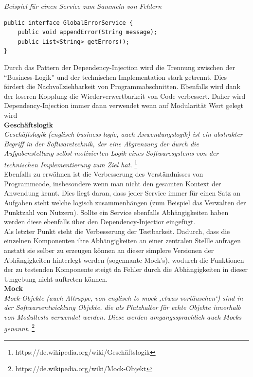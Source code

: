 \begin{minipage}{\textwidth}
\emph{Beispiel für einen Service zum Sammeln von Fehlern}
\begin{lstlisting}
public interface GlobalErrorService {
	public void appendError(String message);
	public List<String> getErrors();
}
\end{lstlisting}
\end{minipage}

Durch das Pattern der Dependency-Injection wird die Trennung zwischen der ``Business-Logik'' und der technischen Implementation stark getrennt. Dies fördert die Nachvollziehbarkeit von Programmabschnitten. Ebenfalls wird dank der loseren Kopplung die Wiederverwertbarkeit von Code verbessert. Daher wird Dependency-Injection immer dann verwendet wenn auf Modularität Wert gelegt wird \\


\textbf{Geschäftslogik} \\
\emph{\glqq   
Geschäftslogik (englisch business logic, auch Anwendungslogik) ist ein abstrakter Begriff in der Softwaretechnik, der eine Abgrenzung der durch die Aufgabenstellung selbst motivierten Logik eines Softwaresystems von der technischen Implementierung zum Ziel hat.
\grqq} \footnote{https://de.wikipedia.org/wiki/Geschäftslogik} \\

Ebenfalls zu erwähnen ist die Verbesserung des Verständnisses von Programmcode, insbesondere wenn man nicht den gesamten Kontext der Anwendung kennt. Dies liegt daran, dass jeder Service immer für einen Satz an Aufgaben steht welche logisch zusammenhängen (zum Beispiel das Verwalten der Punktzahl von Nutzern). Sollte ein Service ebenfalls Abhängigkeiten haben werden diese ebenfalls über den Dependency-Injectior eingefügt. \\

Als letzter Punkt steht die Verbesserung der Testbarkeit. Dadurch, dass die einzelnen Komponenten ihre Abhängigkeiten an einer zentralen Stellle anfragen anstatt sie selber zu erzeugen können an dieser simplere Versionen der Abhängigkeiten hinterlegt werden (sogennante Mock's), wodurch die Funktionen der zu testenden Komponente steigt da Fehler durch die Abhängigkeiten in dieser Umgebung nicht auftreten können. \\

\textbf{Mock} \\
\emph{\glqq   
Mock-Objekte (auch Attrappe, von englisch to mock ‚etwas vortäuschen‘) sind in der Softwareentwicklung Objekte, die als Platzhalter für echte Objekte innerhalb von Modultests verwendet werden. Diese werden umgangssprachlich auch Mocks genannt.
\grqq} \footnote{https://de.wikipedia.org/wiki/Mock-Objekt} \\

